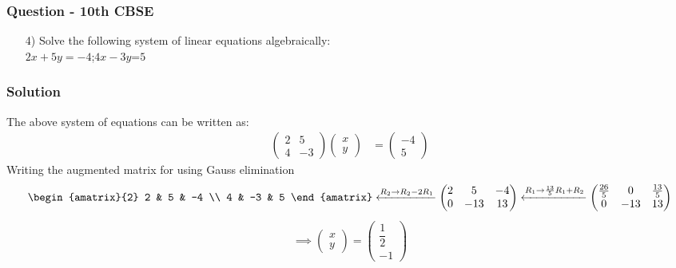 \documentclass{beamer}
\begin{document}
\begin{frame}
\frametitle{Question - 10th CBSE}
\begin{enumerate}
    \item [4)]
Solve the following system of linear equations algebraically:\\
$2x+5y=-4$;$4x-3y$=$5$
\end{enumerate}
\end{frame}

\begin{frame}
\frametitle{Solution}
The above system of equations can be written as:
\begin{align}
    \begin{pmatrix}
        2 & 5\\ 
        4 & -3
    \end{pmatrix}
    \begin{pmatrix}
        x\\
        y
    \end{pmatrix} &= \begin{pmatrix}
        -4\\
        5
    \end{pmatrix} \label{8}
    \end{align}
    Writing the augmented matrix for using Gauss elimination
    \begin{align}
        \begin{amatrix}{2}
   2 & 5 & -4 \\  4 & -3 & 5
 \end{amatrix} \xleftarrow{R_2 \to R_2-2R_1}
  \begin{pmatrix}
   2 & 5 & -4 \\  0 & -13 & 13
 \end{pmatrix} \xleftarrow{R_1 \to \frac{13}{5}R_1+R_2}
 \begin{pmatrix}
   \frac{26}{5} & 0 & \frac{13}{5} \\  0 & -13 & 13
 \end{pmatrix}  \label{14}
 \end{align}
 \begin{align}
     \implies \begin{pmatrix}
        x\\
        y
    \end{pmatrix} =
    \begin{pmatrix}
        \dfrac{1}{2}\\
        -1
    \end{pmatrix}
    \end{align}
\end{frame}
\end{document}
